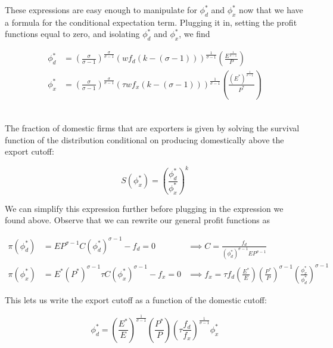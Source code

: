 \documentclass[12pt, letterpaper]{article}
\begin{document}
	These expressions are easy enough to manipulate for \(\phi_d^*\) and \(\phi_x^*\) now that we have a formula for the conditional expectation term. Plugging it in, setting the profit functions equal to zero, and isolating \(\phi_d^*\) and \(\phi_x^*\), we find
	
	\begin{align*}
	\phi_d^* &= \left( \frac{\sigma}{\sigma - 1} \right)^{\frac{\sigma}{\sigma - 1}} \left(w f_d (k - (\sigma - 1))\right)^{\frac{1}{\sigma - 1}} \left(\frac{E^{\frac{1}{\sigma - 1}}}{P}\right) \\
	\phi_x^* &= \left( \frac{\sigma}{\sigma - 1} \right)^{\frac{\sigma}{\sigma - 1}} \left(\tau w f_x (k - (\sigma - 1))\right)^{\frac{1}{\sigma - 1}} \left(\frac{\left(E^*\right)^{\frac{1}{\sigma - 1}}}{P^*}\right) \\
	\end{align*}

    \subsection{}

	The fraction of domestic firms that are exporters is given by solving the survival function of the distribution conditional on producing domestically above the export cutoff:

	\[ S(\phi_x^*) = \left(\frac{\phi_d^*}{\phi_x^*}\right)^k      \]

	We can simplify this expression further before plugging in the expression we found above. Observe that we can rewrite our general profit functions as

	\begin{align*}
	\pi(\phi_d^*) &= EP^{\sigma - 1} C \left(\phi_d^*\right)^{\sigma - 1} - f_d = 0 &\implies C = \frac{f_d}{\left(\phi_d^*\right)^{\sigma - 1} EP^{\sigma - 1}}\\
	\pi(\phi_x^*) &= E^* \left(P^*\right)^{\sigma - 1}\tau C \left(\phi_x^*\right)^{\sigma - 1} - f_x = 0 &\implies f_x = \tau f_d \left(\frac{E^*}{E}\right) \left(\frac{P^*}{P}\right)^{\sigma - 1} \left(\frac{\phi_x^*}{\phi_d^*}\right)^{\sigma - 1} 
	\end{align*}

	This lets us write the export cutoff as a function of the domestic cutoff:

	\[ \phi_d^* = \left(\frac{E^*}{E}\right)^{\frac{1}{\sigma - 1}} \left(\frac{P^*}{P}\right) \left( \tau \frac{f_d}{f_x} \right)^{\frac{1}{\sigma - 1}}  \phi_x^*     \]
\end{document}
